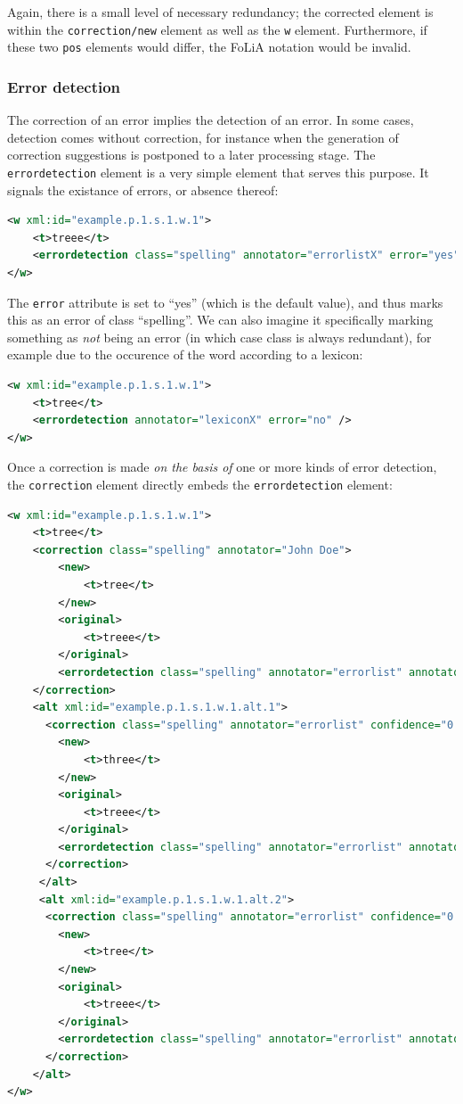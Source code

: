 \documentclass[a4paper,12pt]{report}
\begin{document}
Again, there is a small level of necessary redundancy; the corrected element is within the \texttt{correction/new} element as well as the \texttt{w} element. Furthermore, if these two \texttt{pos} elements would differ, the FoLiA notation would be invalid.

\subsubsection{Error detection} 

The correction of an error implies the detection of an error. In some cases, detection comes without correction, for instance when the generation of correction suggestions is postponed to a later processing stage. The \texttt{errordetection} element is a very simple element that serves this purpose. It signals the existance of errors, or absence thereof:

\begin{lstlisting}[language=xml]
<w xml:id="example.p.1.s.1.w.1">
    <t>treee</t>
    <errordetection class="spelling" annotator="errorlistX" error="yes" />
</w>    
\end{lstlisting}


The \texttt{error} attribute is set to ``yes'' (which is the default value), and thus marks this as an error of class ``spelling''. We can also imagine it specifically marking something as \emph{not} being an error (in which case class is always redundant), for example due to the occurence of the word according to a lexicon:

\begin{lstlisting}[language=xml]
<w xml:id="example.p.1.s.1.w.1">
    <t>tree</t>
    <errordetection annotator="lexiconX" error="no" />
</w>    
\end{lstlisting}

Once a correction is made \emph{on the basis of} one or more kinds of error detection, the \texttt{correction} element directly embeds the \texttt{errordetection} element:

\begin{lstlisting}[language=xml]
<w xml:id="example.p.1.s.1.w.1">
    <t>tree</t>
    <correction class="spelling" annotator="John Doe">
        <new>
            <t>tree</t>
        </new>
        <original>
            <t>treee</t>
        </original>
        <errordetection class="spelling" annotator="errorlist" annotatortype="auto" error="yes" />
    </correction>
    <alt xml:id="example.p.1.s.1.w.1.alt.1">
      <correction class="spelling" annotator="errorlist" confidence="0.4">
        <new>
            <t>three</t>
        </new>
        <original>
            <t>treee</t>
        </original>
        <errordetection class="spelling" annotator="errorlist" annotatortype="auto" error="yes" />
      </correction>    
     </alt>
     <alt xml:id="example.p.1.s.1.w.1.alt.2">
      <correction class="spelling" annotator="errorlist" confidence="0.6">
        <new>
            <t>tree</t>
        </new>
        <original>
            <t>treee</t>
        </original>
        <errordetection class="spelling" annotator="errorlist" annotatortype="auto" error="yes" />
      </correction>    
    </alt>
</w>    
\end{lstlisting}
\end{document}
